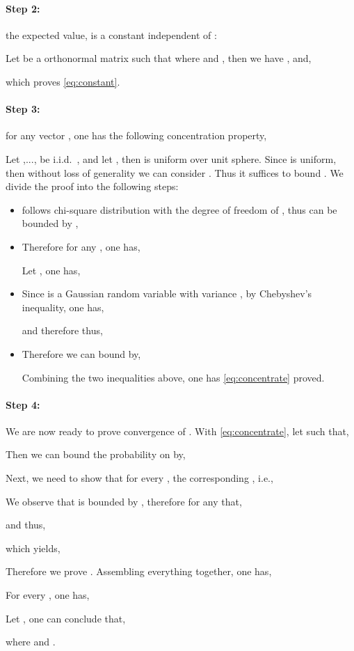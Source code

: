 \documentclass{article} \usepackage{acl2017,times}
\newenvironment{proof}[1][Proof]{\begin{trivlist}
\item[\hskip \labelsep {\bfseries #1}]}{\end{trivlist}}
\begin{document}
\paragraph{Step 2:} the expected value,  is a constant independent of :  

\begin{proof}
    Let  be a orthonormal matrix such that  where  and , then we have , and,
    
    which proves \eqref{eq:constant}.
\end{proof}
\paragraph{Step 3:} for any vector , one has the following concentration property,

\begin{proof}
    Let ,..., be i.i.d.\ , and let , then  is uniform over unit sphere. Since  is uniform, then without loss of generality we can consider  . Thus it suffices to bound . We divide the proof into the following steps:
\begin{itemize}
\item  follows chi-square distribution with the degree of freedom of , thus  can be bounded by \citep{laurent2000adaptive},
    
    \item Therefore for any , one has,
    
   Let , one has,
   
    \item Since  is a Gaussian random variable with variance , by Chebyshev's inequality, one has,
    
    and therefore thus,
    
    \item Therefore we can bound  by,
    
    Combining the two inequalities above, one has \eqref{eq:concentrate} proved.
\end{itemize}
\paragraph{Step 4:} We are now ready to prove convergence of . With \eqref{eq:concentrate}, let  such that,

Then we can bound the probability on  by,

Next, we need to show that for every , the corresponding , i.e.,

We observe that  is bounded by , therefore for any  that,

and thus,

which yields,

Therefore we prove . Assembling everything together, one has,

For every , one has, 

Let , one can conclude that,

where  and .
\end{proof}
\end{document}
